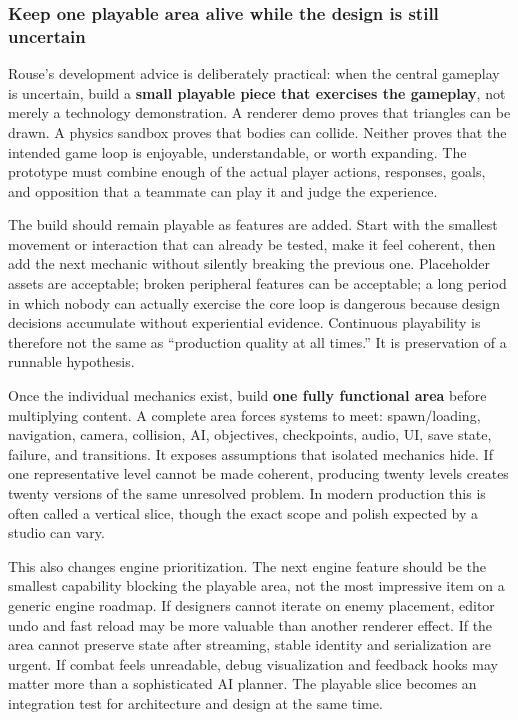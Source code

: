 \subsubsection{Keep one playable area alive while the design is still uncertain}\label{06-engine-ii-ch041-keep-one-playable-area-alive-while-the-design-is-still-uncertain}

\hypertarget{06-engine-ii-ch041-keep-one-playable-area-alive-while-the-design-is-still-uncertain}{}

Rouse's development advice is deliberately practical: when the central gameplay is uncertain, build a \textbf{small playable piece that exercises the gameplay}, not merely a technology demonstration. A renderer demo proves that triangles can be drawn. A physics sandbox proves that bodies can collide. Neither proves that the intended game loop is enjoyable, understandable, or worth expanding. The prototype must combine enough of the actual player actions, responses, goals, and opposition that a teammate can play it and judge the experience.

The build should remain playable as features are added. Start with the smallest movement or interaction that can already be tested, make it feel coherent, then add the next mechanic without silently breaking the previous one. Placeholder assets are acceptable; broken peripheral features can be acceptable; a long period in which nobody can actually exercise the core loop is dangerous because design decisions accumulate without experiential evidence. Continuous playability is therefore not the same as ``production quality at all times.'' It is preservation of a runnable hypothesis.

Once the individual mechanics exist, build \textbf{one fully functional area} before multiplying content. A complete area forces systems to meet: spawn/loading, navigation, camera, collision, AI, objectives, checkpoints, audio, UI, save state, failure, and transitions. It exposes assumptions that isolated mechanics hide. If one representative level cannot be made coherent, producing twenty levels creates twenty versions of the same unresolved problem. In modern production this is often called a vertical slice, though the exact scope and polish expected by a studio can vary.

This also changes engine prioritization. The next engine feature should be the smallest capability blocking the playable area, not the most impressive item on a generic engine roadmap. If designers cannot iterate on enemy placement, editor undo and fast reload may be more valuable than another renderer effect. If the area cannot preserve state after streaming, stable identity and serialization are urgent. If combat feels unreadable, debug visualization and feedback hooks may matter more than a sophisticated AI planner. The playable slice becomes an integration test for architecture and design at the same time.

